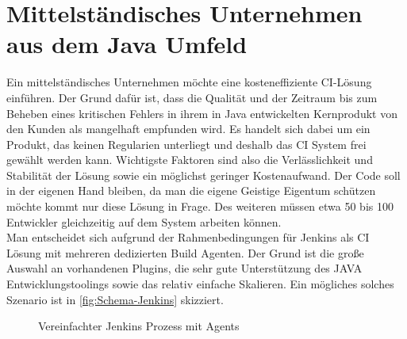 \section{Mittelständisches Unternehmen aus dem Java Umfeld}
Ein mittelständisches Unternehmen möchte eine kosteneffiziente CI-Lösung einführen. Der Grund dafür ist, dass die Qualität und der Zeitraum bis zum Beheben eines kritischen Fehlers in ihrem in Java entwickelten Kernprodukt von den Kunden als mangelhaft empfunden wird. Es handelt sich dabei um ein Produkt, das keinen Regularien unterliegt und deshalb das CI System frei gewählt werden kann. Wichtigste Faktoren sind also die Verlässlichkeit und Stabilität der Lösung sowie ein möglichst geringer Kostenaufwand. Der Code soll in der eigenen Hand bleiben, da man die eigene Geistige Eigentum schützen möchte kommt nur diese Lösung in Frage. Des weiteren müssen etwa 50 bis 100 Entwickler gleichzeitig auf dem System arbeiten können.\\
Man entscheidet sich aufgrund der Rahmenbedingungen für Jenkins als CI Lösung mit mehreren dedizierten Build Agenten. Der Grund ist die große Auswahl an vorhandenen Plugins, die sehr gute Unterstützung des JAVA Entwicklungstoolings sowie das relativ einfache Skalieren. Ein mögliches solches Szenario ist in \autoref{fig:Schema-Jenkins} skizziert.
\begin{figure}[H]
  \centering
  \caption{Vereinfachter Jenkins Prozess mit Agents}\label{fig:Schema-Jenkins}
\end{figure}
